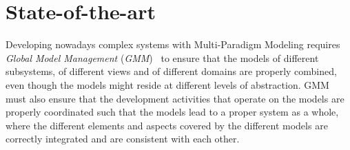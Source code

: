 \section{State-of-the-art }
\label{sec:SotA}



Developing nowadays complex systems with Multi-Paradigm Modeling 
requires \emph{Global Model Management} (\emph{GMM})~\cite{BJRV05,Favre04foundationsof}
to ensure that the models of different subsystems, of different views and
of different domains are properly combined, even though the models might reside
at different levels of abstraction. GMM must also ensure that the development 
activities that operate on the models are properly coordinated such that the models 
lead to a proper system as a whole, where the different elements and aspects covered by the different models are correctly integrated and are consistent with each other.


